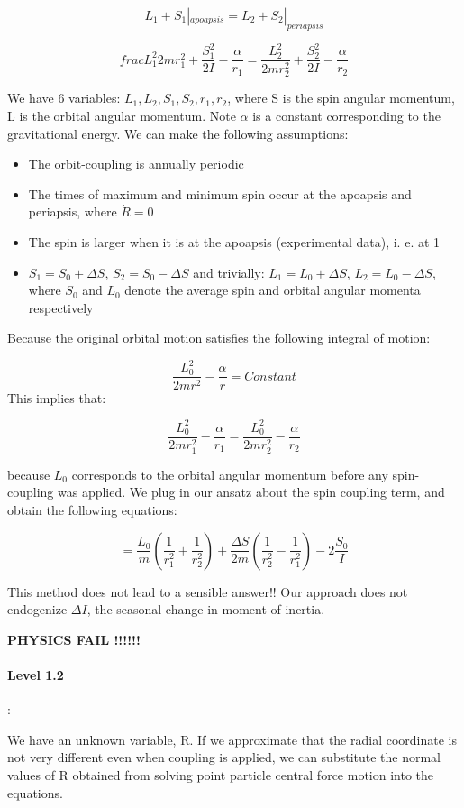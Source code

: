 \documentclass[12pt]{article}
\begin{document}
\begin{equation}
    L_1 + S_1|_{apoapsis} = L_2 + S_2|_{periapsis}
\end{equation}

\begin{equation}
    frac{L_1^2}{2mr_1^2}+ \frac{S_1^2}{2I}- \frac{\alpha}{r_1}= \frac{L_2^2}{2mr_2^2} + \frac{S_2^2}{2I}- \frac{\alpha}{r_2}
\end{equation}

We have 6 variables: $L_1, L_2, S_1, S_2, r_1, r_2$, where S is the spin angular momentum, L is
the orbital angular momentum.  Note $\alpha $ is a constant corresponding to the gravitational energy. We can make the following assumptions:

\begin{itemize}
\item The orbit-coupling is annually periodic
\item The times of maximum and minimum spin occur at the apoapsis and periapsis, where $\dot{R}= 0$
\item The spin is larger when it is at the apoapsis (experimental data), i. e. at 1
\item $S_1 = S_0 + \Delta S$, $S_2 = S_0 - \Delta S$ and trivially: $L_1 = L_0 + \Delta S$, $L_2 = L_0 - \Delta S$, where $S_0$ and $L_0$ denote the average spin and orbital angular momenta respectively
\end{itemize}


Because the original orbital motion satisfies the following integral of motion:

\begin{equation}
    \frac{L_0^2}{2 m r^2} - \frac{\alpha}{r} = Constant
\end{equation}
This implies that:

\begin{equation}
    \frac{L_0^2}{2mr_1^2} - \frac{\alpha}{r_1} = \frac{L_0^2}{2m r_2^2}- \frac{\alpha}{r_2}
\end{equation}

because $L_0$ corresponds to the orbital angular momentum before any spin-coupling was applied.  We plug in our ansatz  %
about the spin coupling term, and obtain the following equations:

\begin{equation}
    = \frac{L_0}{m}  \left(\frac{1}{r_1^2}+ \frac{1}{r_2^2} \right) + \frac{\Delta S}{2m} (\frac{1}{r_2^2}- \frac{1}{r_1^2}) - 2 \frac{S_0}{I}
\end{equation}

This method does not lead to a sensible answer!!  Our approach does not endogenize $\Delta I$, the seasonal change in moment of inertia.

{\bf PHYSICS FAIL !!!!!!}

\paragraph{Level 1.2}:

We have an unknown variable, R.  If we approximate that the radial coordinate is not very different even when coupling is applied, we can substitute the normal values of R obtained from solving point particle central force motion into the equations. 
\end{document}
